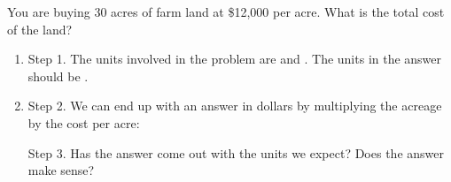 You are buying 30 acres of farm land at \$12,000 per acre. What is the total cost of the land?

\begin{enumerate}
\item Step 1. The units involved in the problem are \underline{\hspace{1in}} and \underline{\hspace{1in}}.
The units in the answer should be \underline{\hspace{1in}}.

\item Step 2. We can end up with an answer in dollars by multiplying the acreage by the cost per acre:
\vspace{1in}


Step 3. Has the answer come out with the units we expect?  Does the answer make sense?
\vspace{0.5in}
\end{enumerate}